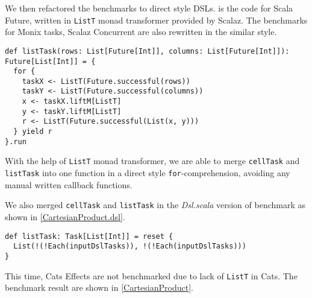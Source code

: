 We then refactored the benchmarks to direct style DSLs.  is the code for Scala Future, written in \lstinline{ListT} monad transformer provided by Scalaz. The benchmarks for Monix tasks, Scalaz Concurrent are also rewritten in the similar style.

\begin{lstlisting}[float=htbp,caption={Cartesian product for Scala Future, based on \lstinline{ListT} transformer},label={CartesianProduct.future}]
def listTask(rows: List[Future[Int]], columns: List[Future[Int]]): Future[List[Int]] = {
  for {
    taskX <- ListT(Future.successful(rows))
    taskY <- ListT(Future.successful(columns))
    x <- taskX.liftM[ListT]
    y <- taskY.liftM[ListT]
    r <- ListT(Future.successful(List(x, y)))
  } yield r
}.run
\end{lstlisting}

With the help of \lstinline{ListT} monad transformer, we are able to merge \lstinline{cellTask} and \lstinline{listTask} into one function in a direct style \lstinline{for}-comprehension, avoiding any manual written callback functions.

We also merged \lstinline{cellTask} and \lstinline{listTask} in the \textit{Dsl.scala} version of benchmark as shown in \cref{CartesianProduct.dsl}.

\begin{lstlisting}[float=htbp,caption={Cartesian product for ordinary CPS functions, in one function},label={CartesianProduct.dsl}]
def listTask: Task[List[Int]] = reset {
  List(!(!Each(inputDslTasks)), !(!Each(inputDslTasks)))
}
\end{lstlisting}

This time, Cats Effects are not benchmarked due to lack of \lstinline{ListT} in Cats. The benchmark result are shown in \cref{CartesianProduct}.

